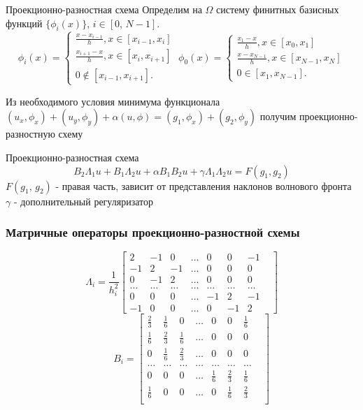 \documentclass[11pt]{beamer}
\begin{document}
\begin{frame}{Проекционно-разностная схема}
Определим на $\Omega$ систему финитных базисных функций $\{\phi_i(x)\} ,\, i \in [0,\,N-1]$.
$$
\phi_i(x) = 
 \begin{cases}
  \frac{x-x_{i-1}}{h} , x \in [x_{i-1},x_i] \\ 
   \frac{x_{i+1} - x}{h}, x \in [x_{i},x_{i+1}]   \\
   0 \notin [x_{i-1},x_{i+1}].
 \end{cases}\;
\phi_0(x) = 
 \begin{cases}
  \frac{x_1-x}{h} , x \in [x_{0},x_1] \\ 
   \frac{x - x_{N-1}}{h}, x \in [x_{N-1},x_{N}]   \\
   0 \in [x_{1},x_{N-1}].
 \end{cases}
$$
\begin{block}{}
Из необходимого условия минимума функционала $(u_x, \phi_x) + (u_y,\phi_y) + \alpha(u, \phi) = (g_1, \phi_x) + (g_2, \phi_y)$ получим проекционно-разностную схему
\end{block}
\begin{block}{Проекционно-разностная схема}
$$B_2 \Lambda_1 u + B_1 \Lambda_2 u + \alpha B_1 B_2 u + \gamma\Lambda_1\Lambda_2u = F(g_1,g_2)$$
$F(g_1,\,g_2)$ - правая часть, зависит от представления наклонов волнового фронта\\
$\gamma$ - дополнительный регуляризатор
\end{block}

\end{frame}

\begin{frame}
\frametitle{Матричные операторы проекционно-разностной схемы}
$$\Lambda_i = \frac{1}{h_i^2}
\begin{bmatrix}
2 & -1 & 0 & \ldots & 0 & 0 & -1\\
-1 & 2 & -1 & \ldots & 0 & 0 & 0\\
0 & -1 & 2 & \ldots &0 & 0 & 0\\
\ldots & \ldots & \ldots & \ldots & \ldots & \ldots & \ldots &\\
0 & 0 & 0 & \ldots & -1 & 2 & -1\\
-1 & 0 & 0 & \ldots & 0 & -1 & 2
\end{bmatrix}
$$$$
\qquad B_i = 
\begin{bmatrix}
\frac{2}{3} & \frac{1}{6} & 0 & \ldots & 0 & 0 & \frac{1}{6}\\
\frac{1}{6} & \frac{2}{3} & \frac{1}{6} & \ldots & 0 & 0 & 0\\
0 & \frac{1}{6} & \frac{2}{3} & \ldots &0 & 0 & 0\\
\ldots & \ldots & \ldots & \ldots & \ldots & \ldots & \ldots &\\
0 & 0 & 0 & \ldots & \frac{1}{6} & \frac{2}{3} & \frac{1}{6}\\
\frac{1}{6} & 0 & 0 & \ldots & 0 & \frac{1}{6} & \frac{2}{3} \\
\end{bmatrix}$$

\end{frame}
\end{document}
